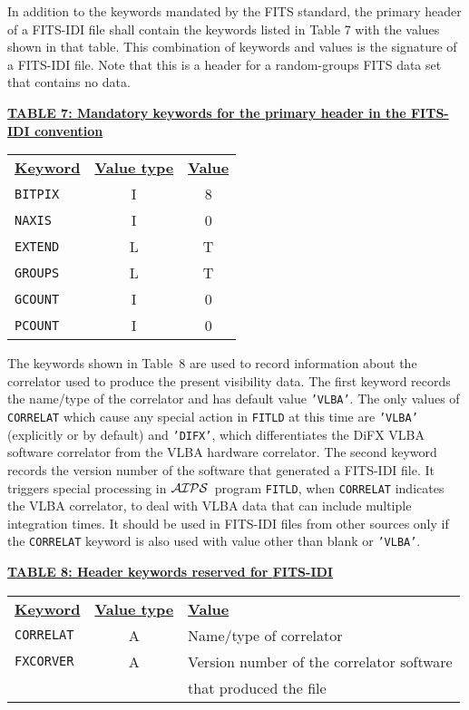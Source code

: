 \documentclass[twoside]{article}
\newcommand{\Hi}[1]{\textcolor{hicol}{#1}}
\newcommand{\Me}[1]{\textcolor{mecol}{#1}}
\newcommand{\AIPS}{{$\cal AIPS\/$}}
\begin{document}
In addition to the keywords mandated by the FITS standard, the
primary header of a FITS-IDI file shall contain the keywords listed in
Table 7 with the values shown in that table.  This combination of
keywords and values is the signature of a FITS-IDI file.  Note that
this is a header for a random-groups FITS data set that contains no
data.

\begin{center}
\underline{\bf{TABLE 7: Mandatory keywords for the
    primary header \Hi{in the FITS-IDI convention}}}\\
\begin{tabular}{lcc}
\noalign{\vspace{2pt}}
\underline{{\bf Keyword}} & \underline{\bf{Value type}} &
    \underline{\bf{Value\vphantom{y}}} \\
\noalign{\vspace{2pt}}
\Me{{\tt BITPIX}} & \Me{I} & \Me{8} \\
{\tt NAXIS}  & I & 0 \\
{\tt EXTEND} & L & T \\
{\tt GROUPS} & L & T \\
{\tt GCOUNT} & I & 0 \\
{\tt PCOUNT} & I & 0
\end{tabular}
\end{center}

The keyword\Hi{s} shown in Table~8 \Hi{are} used to record
\Hi{information about the correlator used to produce the present
visibility data.  The first keyword records the name/type of the
correlator and has default value {\tt 'VLBA'}.  The only values of
{\tt CORRELAT} which cause any special action in {\tt FITLD} at this
time are {\tt 'VLBA'} (explicitly or by default) and {\tt 'DIFX'},
which differentiates the DiFX VLBA software correlator from the VLBA
hardware correlator.  The second keyword records the version number of
the software that generated a FITS-IDI file.  It triggers special
processing in \AIPS\ program {\tt FITLD}, when {\tt CORRELAT}
indicates the VLBA correlator, to deal with VLBA data that can include
multiple integration times.  It should be used in FITS-IDI files from
other sources only if the {\tt CORRELAT} keyword is also used with
value other than blank or {\tt 'VLBA'}\@.}

\begin{center}
\underline{\bf{TABLE 8: Header keywords reserved for \Hi{FITS-IDI}}}\\
\begin{tabular}{lcl}
\noalign{\vspace{2pt}}
\underline{{\bf Keyword}} & \underline{\bf{Value type}} &
    \underline{\bf{Value\vphantom{y}}} \\
\noalign{\vspace{2pt}}
\Hi{\tt CORRELAT} & \Hi{A} & \Hi{Name/type of correlator} \\
{\tt FXCORVER} & A & Version number of the correlator software\\
               &   & that produced the file
\end{tabular}
\end{center}
\end{document}
